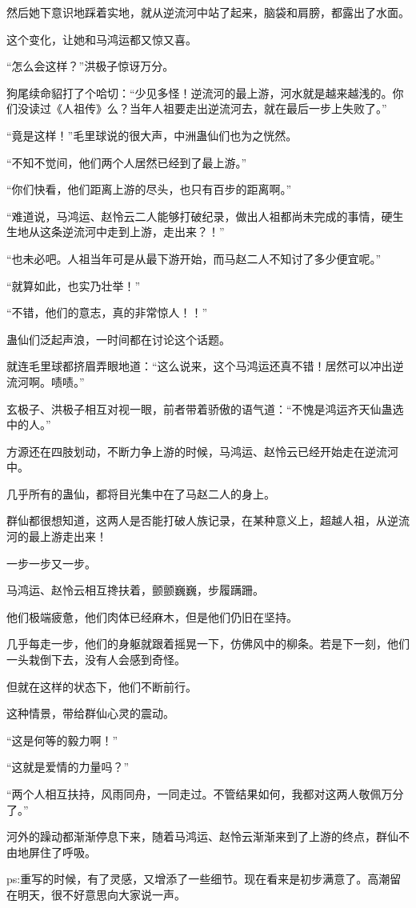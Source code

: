 \begin{this_body}
然后她下意识地踩着实地，就从逆流河中站了起来，脑袋和肩膀，都露出了水面。

这个变化，让她和马鸿运都又惊又喜。

“怎么会这样？”洪极子惊讶万分。

狗尾续命貂打了个哈切：“少见多怪！逆流河的最上游，河水就是越来越浅的。你们没读过《人祖传》么？当年人祖要走出逆流河去，就在最后一步上失败了。”

“竟是这样！”毛里球说的很大声，中洲蛊仙们也为之恍然。

“不知不觉间，他们两个人居然已经到了最上游。”

“你们快看，他们距离上游的尽头，也只有百步的距离啊。”

“难道说，马鸿运、赵怜云二人能够打破纪录，做出人祖都尚未完成的事情，硬生生地从这条逆流河中走到上游，走出来？！”

“也未必吧。人祖当年可是从最下游开始，而马赵二人不知讨了多少便宜呢。”

“就算如此，也实乃壮举！”

“不错，他们的意志，真的非常惊人！！”

蛊仙们泛起声浪，一时间都在讨论这个话题。

就连毛里球都挤眉弄眼地道：“这么说来，这个马鸿运还真不错！居然可以冲出逆流河啊。啧啧。”

玄极子、洪极子相互对视一眼，前者带着骄傲的语气道：“不愧是鸿运齐天仙蛊选中的人。”

方源还在四肢划动，不断力争上游的时候，马鸿运、赵怜云已经开始走在逆流河中。

几乎所有的蛊仙，都将目光集中在了马赵二人的身上。

群仙都很想知道，这两人是否能打破人族记录，在某种意义上，超越人祖，从逆流河的最上游走出来！

一步一步又一步。

马鸿运、赵怜云相互搀扶着，颤颤巍巍，步履蹒跚。

他们极端疲惫，他们肉体已经麻木，但是他们仍旧在坚持。

几乎每走一步，他们的身躯就跟着摇晃一下，仿佛风中的柳条。若是下一刻，他们一头栽倒下去，没有人会感到奇怪。

但就在这样的状态下，他们不断前行。

这种情景，带给群仙心灵的震动。

“这是何等的毅力啊！”

“这就是爱情的力量吗？”

“两个人相互扶持，风雨同舟，一同走过。不管结果如何，我都对这两人敬佩万分了。”

河外的躁动都渐渐停息下来，随着马鸿运、赵怜云渐渐来到了上游的终点，群仙不由地屏住了呼吸。

ps:重写的时候，有了灵感，又增添了一些细节。现在看来是初步满意了。高潮留在明天，很不好意思向大家说一声。

\end{this_body}

